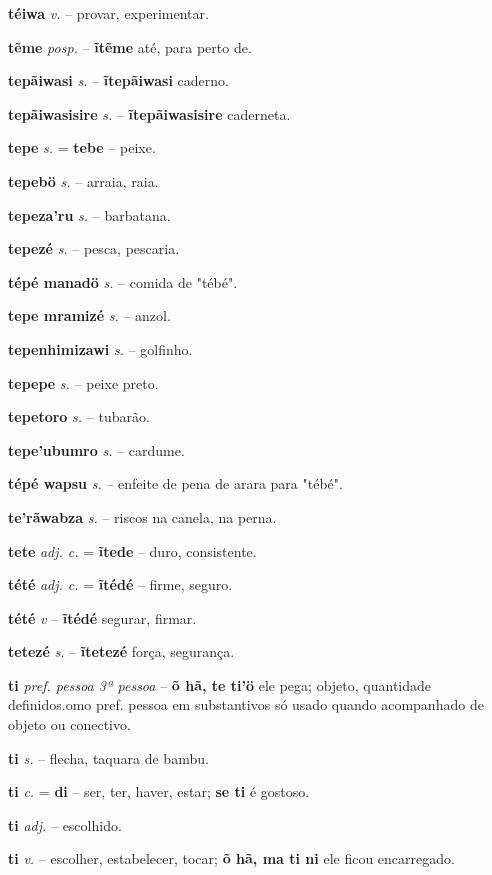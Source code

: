 \textbf{téiwa} \textit{v.} -- provar, experimentar.

\textbf{tẽme} \textit{posp.} -- \textbf{ĩtẽme} até, para perto de.

\textbf{tepãiwasi} \textit{s.} -- \textbf{ĩtepãiwasi} caderno.

\textbf{tepãiwasisire} \textit{s.} -- \textbf{ĩtepãiwasisire} caderneta.

\textbf{tepe} \textit{s.} = \textbf{tebe} -- peixe.

\textbf{tepebö} \textit{s.} -- arraia, raia.

\textbf{tepeza'ru} \textit{s.} -- barbatana.

\textbf{tepezé} \textit{s.} -- pesca, pescaria.

\textbf{tépé manadö} \textit{s.} -- comida de "tébé".

\textbf{tepe mramizé} \textit{s.} -- anzol.

\textbf{tepenhimizawi} \textit{s.} -- golfinho.

\textbf{tepepe} \textit{s.} -- peixe preto.

\textbf{tepetoro} \textit{s.} -- tubarão.

\textbf{tepe'ubumro} \textit{s.} -- cardume.

\textbf{tépé wapsu} \textit{s.} -- enfeite de pena de arara para "tébé".

\textbf{te'rãwabza} \textit{s.} -- riscos na canela, na perna.

\textbf{tete} \textit{adj. c.} = \textbf{ĩtede} -- duro, consistente.

\textbf{tété} \textit{adj. c.} = \textbf{ĩtédé} -- firme, seguro.

\textbf{tété} \textit{v} -- \textbf{ĩtédé} segurar, firmar.

\textbf{tetezé} \textit{s.} -- \textbf{ĩtetezé} força, segurança.

\textbf{ti} \textit{pref. pessoa 3ª pessoa} -- \textbf{õ hã, te ti'ö} ele pega; objeto, quantidade definidos.omo pref. pessoa em substantivos só usado quando acompanhado de objeto ou conectivo.

\textbf{ti} \textit{s.} -- flecha, taquara de bambu.

\textbf{ti} \textit{c.} = \textbf{di} -- ser, ter, haver, estar; \textbf{se ti} é gostoso.

\textbf{ti} \textit{adj.} -- escolhido.

\textbf{ti} \textit{v.} -- escolher, estabelecer, tocar; \textbf{õ hã, ma ti ni} ele ficou encarregado.

